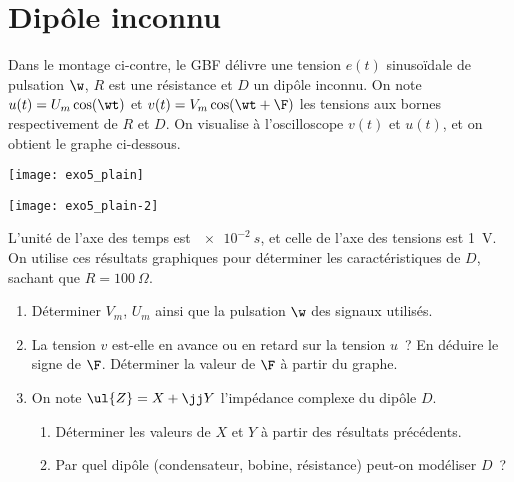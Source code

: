 \documentclass[a4paper, 12pt, final, garamond]{book}
\begin{document}
\section{Dipôle inconnu}

\begin{minipage}{0.60\linewidth}
    Dans le montage ci-contre, le GBF délivre une tension $e(t)$ sinusoïdale de
    pulsation $\w$, $R$ est une résistance et $D$ un dipôle inconnu. On note
    $u(t) = U_m\cos(\wt)$ et $v(t) = V_m\cos(\wt+\F)$ les tensions aux bornes
    respectivement de $R$ et $D$. On visualise à l'oscilloscope $v(t)$ et
    $u(t)$, et on obtient le graphe ci-dessous.
\end{minipage}
\begin{minipage}{0.35\linewidth}
    \begin{center}
        \texttt{[image: exo5\_plain]}
    \end{center}
\end{minipage}

\begin{center}
    \texttt{[image: exo5\_plain-2]}
\end{center}

L'unité de l'axe des temps est $\SI{e-2}{s}$, et celle de l'axe des tensions est
\SI{1}{V}. On utilise ces résultats graphiques pour déterminer les
caractéristiques de $D$, sachant que $R = \SI{100}{\Omega}$.

\begin{enumerate}
    \item Déterminer $V_m$, $U_m$ ainsi que la pulsation $\w$ des signaux
        utilisés.
    \item La tension $v$ est-elle en avance ou en retard sur la tension $u$~? En
        déduire le signe de $\F$. Déterminer la valeur de $\F$ à partir du
        graphe.
    \item On note $\ul{Z} = X + \jj Y$ l'impédance complexe du dipôle $D$.
        \begin{enumerate}
            \item Déterminer les valeurs de $X$ et $Y$ à partir des résultats
                précédents.
            \item Par quel dipôle (condensateur, bobine, résistance) peut-on
                modéliser $D$~?
        \end{enumerate}
\end{enumerate}
\end{document}
